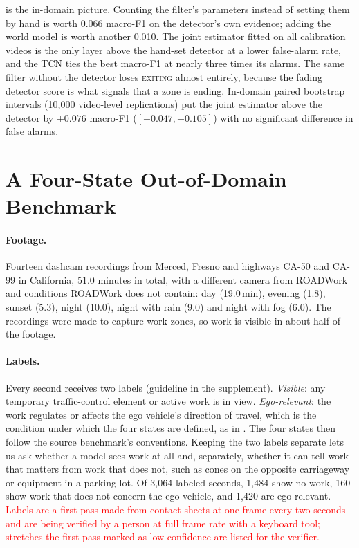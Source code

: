 \documentclass[conference]{IEEEtran}
\newcommand{\st}[1]{\textsc{#1}}
\newcommand{\draftnote}[1]{\textcolor{red}{#1}}
\begin{document}
 is the in-domain picture. Counting the filter's parameters instead of setting them by hand is worth 0.066 macro-F1 on the detector's own evidence; adding the world model is worth another 0.010. The joint estimator fitted on all calibration videos is the only layer above the hand-set detector at a lower false-alarm rate, and the TCN ties the best macro-F1 at nearly three times its alarms. The same filter without the detector loses \st{exiting} almost entirely, because the fading detector score is what signals that a zone is ending. In-domain paired bootstrap intervals (10{,}000 video-level replications) put the joint estimator above the detector by $+0.076$ macro-F1 ($[+0.047, +0.105]$) with no significant difference in false alarms.

\section{A Four-State Out-of-Domain Benchmark}
\label{sec:benchmark}

\paragraph{Footage.} Fourteen dashcam recordings from Merced, Fresno and highways CA-50 and CA-99 in California, 51.0 minutes in total, with a different camera from ROADWork and conditions ROADWork does not contain: day (19.0\,min), evening (1.8), sunset (5.3), night (10.0), night with rain (9.0) and night with fog (6.0). The recordings were made to capture work zones, so work is visible in about half of the footage.

\paragraph{Labels.} Every second receives two labels (guideline in the supplement). \emph{Visible}: any temporary traffic-control element or active work is in view. \emph{Ego-relevant}: the work regulates or affects the ego vehicle's direction of travel, which is the condition under which the four states are defined, as in \cite{priorsystem2026}. The four states then follow the source benchmark's conventions. Keeping the two labels separate lets us ask whether a model sees work at all and, separately, whether it can tell work that matters from work that does not, such as cones on the opposite carriageway or equipment in a parking lot. Of 3{,}064 labeled seconds, 1{,}484 show no work, 160 show work that does not concern the ego vehicle, and 1{,}420 are ego-relevant. \draftnote{Labels are a first pass made from contact sheets at one frame every two seconds and are being verified by a person at full frame rate with a keyboard tool; stretches the first pass marked as low confidence are listed for the verifier.}
\end{document}

